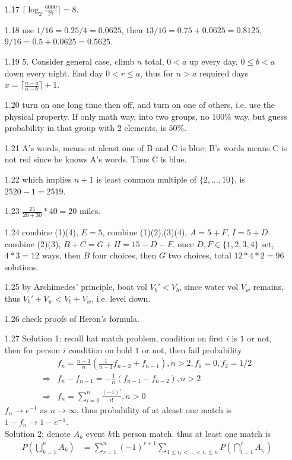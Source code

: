 \documentclass[paper=a4, fontsize=11pt]{scrartcl} %
\numberwithin{equation}{section} %
\numberwithin{figure}{section} %
\numberwithin{table}{section} %
\begin{document}
\begin{itemize}
	\item[1.17] $\lceil\log_2 \frac{6000}{27}\rceil = 8$.
	\item[1.18] use $1/16=0.25/4= 0.0625$, then $13/16= 0.75+0.0625 = 0.8125$, $9/16=0.5+0.0625=0.5625$.
	\item[1.19] $5$. Consider general case, climb $n$ total, $0<a$ up every day, $0\leq b<a$ down every night. End day $0<r\leq a$, thus for $n>a$ required days $x= \lceil\frac{n-a}{a-b}\rceil +1$.
	\item[1.20] turn on one long time then off, and turn on one of others, i.e. use the physical property. If only math way, into two groups, no $100\%$ way, but guess probability in that group with $2$ elements, is $50\%$.
	\item[1.21] A's words, means at aleast one of B and C is blue; B's words means C is not red since he knows A's words. Thus C is blue.
	\item[1.22] which implies $n+1$ is least common multiple of $\{2,...,10\}$, is $2520-1=2519$.
	\item[1.23] $\frac{25}{20+30}*40 = 20$ miles.
	\item[1.24] combine (1)(4), $E=5$, combine (1)(2),(3)(4), $A=5+F$, $I=5+D$. combine (2)(3), $B+C=G+H=15-D-F$. once $D,F\in\{1,2,3,4\}$ set, $4*3=12$ ways, then $B$ four choices, then $G$ two choices, total $12*4*2=96$ solutions.
	\item[1.25] by Archimedes' principle, boat vol $V_b'<V_b$, since water vol $V_w$ remains, thus $V_b'+V_w < V_b+V_w$, i.e. level down. 
	\item[1.26] check proofs of Heron's formula. %
	\item[1.27] Solution 1: recall hat match problem, condition on first $i$ is $1$ or not, then for person $i$ condition on hold $1$ or not, then fail probability 
	\begin{align}
		&f_n = \frac{n-1}{n}(\frac{1}{n-1} f_{n-2}+ f_{n-1}), n> 2,f_1=0,f_2=1/2\\
		\Rightarrow &f_n - f_{n-1} = -\frac{1}{n}(f_{n-1}-f_{n-2}), n>2\\
		\Rightarrow & f_n= \sum_{i=0}^n \frac{(-1)^i}{i!} , n>0
	\end{align}
	$f_n\rightarrow e^{-1}$ as $n\rightarrow \infty$, thus probability of at aleast one match is $1-f_n \rightarrow 1-e^{-1}$.\\
	Solution 2: denote $A_k$ event $k$th person match. thus at least one match is 
	\begin{align}
		P(\bigcup_{k=1}^n A_k) &= \sum_{r=1}^n (-1)^{r+1}\sum_{1\leq i_1<...<i_r\leq n} P(\bigcap_{l=1}^r A_{i_l})\\

\end{align}
\end{itemize}
\end{document}
